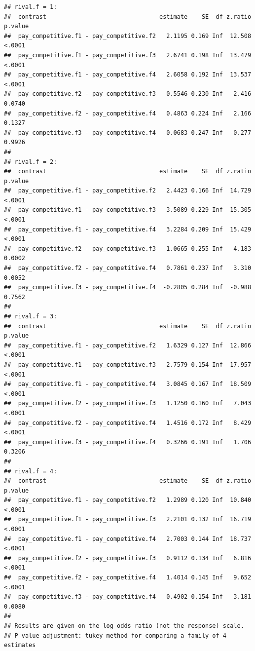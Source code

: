 \documentclass[
]{article}
\begin{document}
\begin{verbatim}
## rival.f = 1:
##  contrast                                estimate    SE  df z.ratio p.value
##  pay_competitive.f1 - pay_competitive.f2   2.1195 0.169 Inf  12.508  <.0001
##  pay_competitive.f1 - pay_competitive.f3   2.6741 0.198 Inf  13.479  <.0001
##  pay_competitive.f1 - pay_competitive.f4   2.6058 0.192 Inf  13.537  <.0001
##  pay_competitive.f2 - pay_competitive.f3   0.5546 0.230 Inf   2.416  0.0740
##  pay_competitive.f2 - pay_competitive.f4   0.4863 0.224 Inf   2.166  0.1327
##  pay_competitive.f3 - pay_competitive.f4  -0.0683 0.247 Inf  -0.277  0.9926
## 
## rival.f = 2:
##  contrast                                estimate    SE  df z.ratio p.value
##  pay_competitive.f1 - pay_competitive.f2   2.4423 0.166 Inf  14.729  <.0001
##  pay_competitive.f1 - pay_competitive.f3   3.5089 0.229 Inf  15.305  <.0001
##  pay_competitive.f1 - pay_competitive.f4   3.2284 0.209 Inf  15.429  <.0001
##  pay_competitive.f2 - pay_competitive.f3   1.0665 0.255 Inf   4.183  0.0002
##  pay_competitive.f2 - pay_competitive.f4   0.7861 0.237 Inf   3.310  0.0052
##  pay_competitive.f3 - pay_competitive.f4  -0.2805 0.284 Inf  -0.988  0.7562
## 
## rival.f = 3:
##  contrast                                estimate    SE  df z.ratio p.value
##  pay_competitive.f1 - pay_competitive.f2   1.6329 0.127 Inf  12.866  <.0001
##  pay_competitive.f1 - pay_competitive.f3   2.7579 0.154 Inf  17.957  <.0001
##  pay_competitive.f1 - pay_competitive.f4   3.0845 0.167 Inf  18.509  <.0001
##  pay_competitive.f2 - pay_competitive.f3   1.1250 0.160 Inf   7.043  <.0001
##  pay_competitive.f2 - pay_competitive.f4   1.4516 0.172 Inf   8.429  <.0001
##  pay_competitive.f3 - pay_competitive.f4   0.3266 0.191 Inf   1.706  0.3206
## 
## rival.f = 4:
##  contrast                                estimate    SE  df z.ratio p.value
##  pay_competitive.f1 - pay_competitive.f2   1.2989 0.120 Inf  10.840  <.0001
##  pay_competitive.f1 - pay_competitive.f3   2.2101 0.132 Inf  16.719  <.0001
##  pay_competitive.f1 - pay_competitive.f4   2.7003 0.144 Inf  18.737  <.0001
##  pay_competitive.f2 - pay_competitive.f3   0.9112 0.134 Inf   6.816  <.0001
##  pay_competitive.f2 - pay_competitive.f4   1.4014 0.145 Inf   9.652  <.0001
##  pay_competitive.f3 - pay_competitive.f4   0.4902 0.154 Inf   3.181  0.0080
## 
## Results are given on the log odds ratio (not the response) scale. 
## P value adjustment: tukey method for comparing a family of 4 estimates
\end{verbatim}
\end{document}

